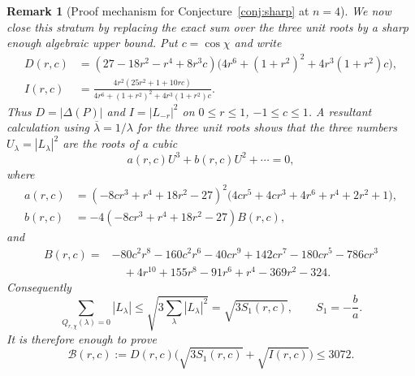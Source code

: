 \documentclass[11pt]{article}
\newtheorem{remark}[theorem]{Remark}
\numberwithin{equation}{section}
\begin{document}
\begin{remark}[Proof mechanism for Conjecture~\ref{conj:sharp} at $n=4$]
We now close this stratum by replacing the exact sum over the three unit
roots by a sharp enough algebraic upper bound.  Put $c=\cos\chi$ and write
\[
\begin{aligned}
  D(r,c)&=(27-18r^2-r^4+8r^3c)
  \bigl(4r^6+(1+r^2)^2+4r^3(1+r^2)c\bigr),\\
  I(r,c)&=\frac{4r^2(25r^2+1+10rc)}
  {4r^6+(1+r^2)^2+4r^3(1+r^2)c}.
\end{aligned}
\]
Thus $D=|\Delta(P)|$ and $I=|L_{-r}|^2$ on
$0\le r\le1$, $-1\le c\le1$.  A resultant calculation using
$\overline{\lambda}=1/\lambda$ for the three unit roots shows that the three
numbers $U_\lambda=|L_\lambda|^2$ are the roots of a cubic
\[
  a(r,c)U^3+b(r,c)U^2+\cdots=0,
\]
where
\[
\begin{aligned}
a(r,c)&=(-8cr^3+r^4+18r^2-27)^2
       \bigl(4cr^5+4cr^3+4r^6+r^4+2r^2+1\bigr),\\
b(r,c)&=-4(-8cr^3+r^4+18r^2-27)B(r,c),
\end{aligned}
\]
and
\[
\begin{aligned}
B(r,c)=&-80c^2r^8-160c^2r^6-40cr^9+142cr^7-180cr^5-786cr^3\\
&\quad+4r^{10}+155r^8-91r^6+r^4-369r^2-324 .
\end{aligned}
\]
Consequently
\[
  \sum_{Q_{r,\chi}(\lambda)=0}|L_\lambda|
  \le \sqrt{3\sum_\lambda |L_\lambda|^2}
  =\sqrt{3S_1(r,c)},\qquad S_1=-\frac{b}{a}.
\]
It is therefore enough to prove
\begin{equation}\label{eq:3plus1-B-bound}
  \mathcal B(r,c):=D(r,c)\bigl(\sqrt{3S_1(r,c)}+\sqrt{I(r,c)}\bigr)\le3072.
\end{equation}


\end{remark}
\end{document}
